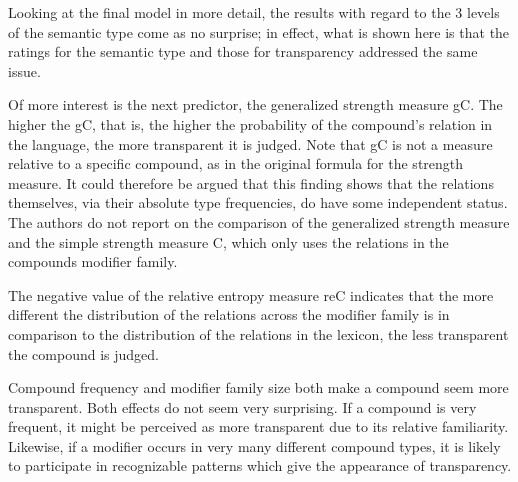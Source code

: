 Looking at the final model in more detail, the results with
regard to the 3 levels of the semantic type come as no surprise;
in effect, what is shown here is that the ratings for the semantic
type and those for transparency addressed the same issue. 

Of more interest is the next predictor, the generalized strength
measure gC. 
The higher the gC, that is, the
higher the probability of the compound's relation in the language, the
more transparent it is judged. Note that gC is
not a measure relative to a specific compound, as in the original
formula for the strength measure. It could therefore be
argued that this finding shows that the relations themselves, via their
absolute type frequencies, do have some independent status. The authors
do not report on the comparison of the generalized strength measure
and the simple strength measure C, which only uses the relations in
the compounds modifier family.

The negative
value of the relative entropy measure reC indicates that the more different the distribution of the relations
across the modifier family is in comparison to the distribution of the
relations in the lexicon, the less transparent the compound is judged.

Compound frequency and modifier family size both make a compound seem
more transparent. Both effects do not seem very surprising. If a
compound is very frequent, it might be perceived as more transparent
due to its relative familiarity. Likewise, if a modifier occurs in
very many different compound types, it is likely to participate in
recognizable patterns which give the appearance of transparency. 

